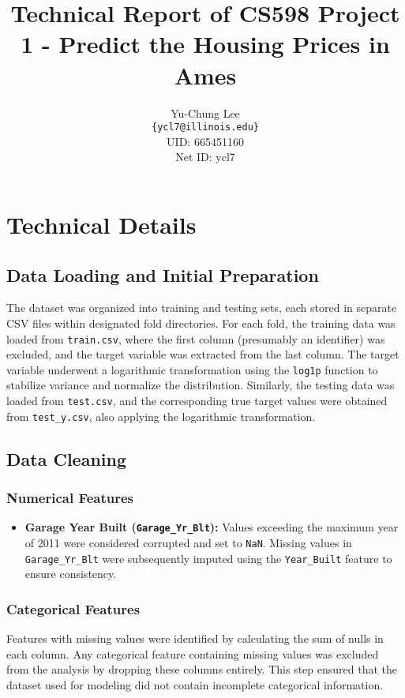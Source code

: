 \documentclass[11pt,a4paper]{article}
\title{Technical Report of CS598 Project 1 - Predict the Housing Prices in Ames}
\author{Yu-Chung Lee \\
  \texttt{\{ycl7@illinois.edu\}} \\
  UID: 665451160 \\
  Net ID: ycl7 \\
  }
\begin{document}
\maketitle

\section{Technical Details}

\subsection{Data Loading and Initial Preparation}
The dataset was organized into training and testing sets, each stored in
separate CSV files within designated fold directories. For each fold, the
training data was loaded from \texttt{train.csv}, where the first column
(presumably an identifier) was excluded, and the target variable was extracted
from the last column. The target variable underwent a logarithmic
transformation using the \texttt{log1p} function to stabilize variance and
normalize the distribution. Similarly, the testing data was loaded from
\texttt{test.csv}, and the corresponding true target values were obtained from
\texttt{test\_y.csv}, also applying the logarithmic transformation.

\subsection{Data Cleaning}
\subsubsection{Numerical Features}
\begin{itemize}
  \item \textbf{Garage Year Built (\texttt{Garage\_Yr\_Blt}):} Values exceeding the maximum year of 2011 were considered corrupted and set to \texttt{NaN}. Missing values in \texttt{Garage\_Yr\_Blt} were subsequently imputed using the \texttt{Year\_Built} feature to ensure consistency.
\end{itemize}

\subsubsection{Categorical Features}
Features with missing values were identified by calculating the sum of nulls in
each column. Any categorical feature containing missing values was excluded
from the analysis by dropping these columns entirely. This step ensured that
the dataset used for modeling did not contain incomplete categorical
information.
\end{document}
